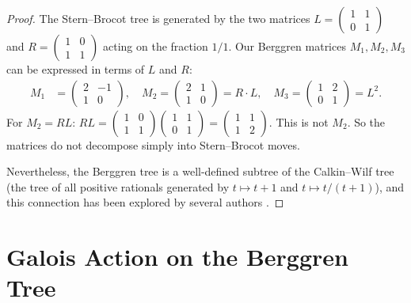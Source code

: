 \documentclass[12pt]{amsart}
\theoremstyle{definition}
\theoremstyle{remark}
\begin{document}
\begin{proof}
The Stern--Brocot tree is generated by the two matrices
$L = \left(\begin{smallmatrix}1&1\\0&1\end{smallmatrix}\right)$ and
$R = \left(\begin{smallmatrix}1&0\\1&1\end{smallmatrix}\right)$
acting on the fraction $1/1$.  Our Berggren matrices $M_1, M_2, M_3$
can be expressed in terms of $L$ and $R$:
\begin{align*}
  M_1 &= \begin{pmatrix}2&-1\\1&0\end{pmatrix}, \quad
  M_2 = \begin{pmatrix}2&1\\1&0\end{pmatrix} = R\cdot L, \quad
  M_3 = \begin{pmatrix}1&2\\0&1\end{pmatrix} = L^2.
\end{align*}
For $M_2 = RL$: $RL = \left(\begin{smallmatrix}1&0\\1&1\end{smallmatrix}\right)\left(\begin{smallmatrix}1&1\\0&1\end{smallmatrix}\right) = \left(\begin{smallmatrix}1&1\\1&2\end{smallmatrix}\right)$.
This is not $M_2$.  So the matrices do not decompose simply into
Stern--Brocot moves.

Nevertheless, the Berggren tree is a well-defined subtree of the
Calkin--Wilf tree (the tree of all positive rationals generated by
$t\mapsto t+1$ and $t\mapsto t/(t+1)$), and this connection has been
explored by several authors \cite{romik2008}.
\end{proof}


\section{Galois Action on the Berggren Tree}\label{sec:galois}
\end{document}

